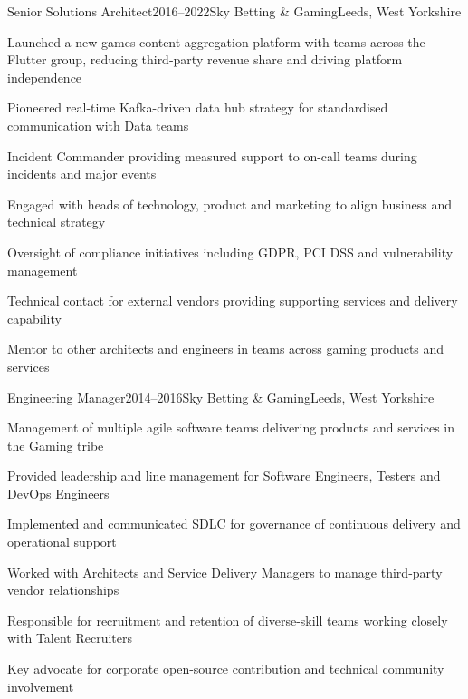 \documentclass{cv}
\begin{document}

\begin{experience}{Senior Solutions Architect}{2016--2022}{Sky Betting \& Gaming}{Leeds, West Yorkshire}
\item Launched a new games content aggregation platform with teams across the Flutter group, reducing
      third-party revenue share and driving platform independence
\item Pioneered real-time Kafka-driven data hub strategy for standardised communication with Data teams
\item Incident Commander providing measured support to on-call teams during incidents and major events
\item Engaged with heads of technology, product and marketing to align business and technical strategy
\item Oversight of compliance initiatives including GDPR, PCI DSS and vulnerability management
\item Technical contact for external vendors providing supporting services and delivery capability
\item Mentor to other architects and engineers in teams across gaming products and services
\end{experience}


\begin{experience}{Engineering Manager}{2014--2016}{Sky Betting \& Gaming}{Leeds, West Yorkshire}
\item Management of multiple agile software teams delivering products and services in the Gaming tribe
\item Provided leadership and line management for Software Engineers, Testers and DevOps Engineers
\item Implemented and communicated SDLC for governance of continuous delivery and operational support
\item Worked with Architects and Service Delivery Managers to manage third-party vendor relationships
\item Responsible for recruitment and retention of diverse-skill teams working closely with Talent Recruiters
\item Key advocate for corporate open-source contribution and technical community involvement
\end{experience}
\end{document}
